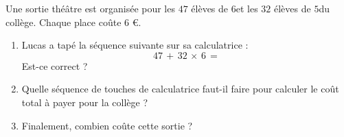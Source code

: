 
\begin{exercice}\label{exosmath-0735}

Une sortie théâtre est organisée pour les $47$ élèves de \( 6\)\ieme et les $32$ élèves de \( 5\)\ieme du collège. Chaque place coûte 6 €.

\begin{enumerate}
    \item
        Lucas a tapé la séquence suivante sur sa calculatrice :
\begin{equation}
    \boxed{47}\,\boxed{+}\,\boxed{32}\,\boxed{\times}\,\boxed{6}\,\boxed{=}
\end{equation}
        Est-ce correct ?
    \item
        Quelle séquence de touches de calculatrice faut-il faire pour calculer le coût total à payer pour la collège ?
    \item
        Finalement, combien coûte cette sortie ?
\end{enumerate}

\end{exercice}
